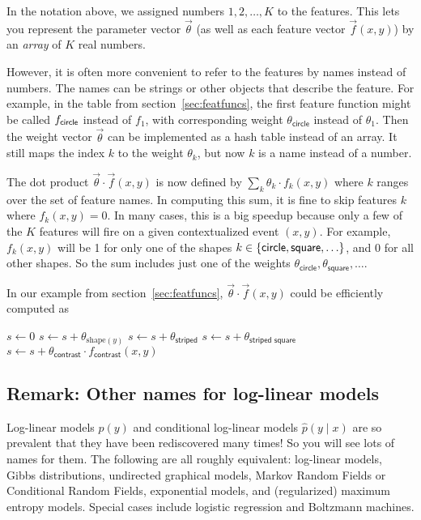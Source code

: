 \documentclass[11pt]{article}
\newcommand{\vtheta}{\vec{\theta}}
\newcommand{\ph}{\hat{p}}
\begin{document}
In the notation above, we assigned numbers $1,2,\ldots,K$ to the
features.  This lets you represent the parameter vector $\vtheta$
(as well as each feature vector $\vec{f}(x,y)$) by an {\em array} of
$K$ real numbers.

However, it is often more convenient to refer to the features by names
instead of numbers.  The names can be strings or other objects that
describe the feature.  For example, in the table from
section~\ref{sec:featfuncs}, the first feature function might be
called $f_{\sf circle}$ instead of $f_1$, with corresponding weight
$\theta_{\textsf{circle}}$ instead of $\theta_1$.  Then the weight vector
$\vtheta$ can be implemented as a hash table instead of an array.  It
still maps the index $k$ to the weight $\theta_k$, but now $k$ is a
name instead of a number.

The dot product $\vtheta \cdot \vec{f}(x,y)$ is now defined by
$\sum_k \theta_k \cdot f_k(x,y)$ where $k$ ranges over the set of
feature names.  
In computing this sum, it is fine to skip features $k$ where $f_k(x,y)
= 0$.  In many cases, this is a big speedup because only a few of the
$K$ features will fire on a given contextualized event $(x,y)$.  For
example, $f_k(x,y)$ will be 1 for only one of the shapes $k \in \{{\sf
  circle}, {\sf square}, \ldots\}$, and 0 for all other shapes.  So the 
sum includes just one of the weights $\theta_{\textsf{circle}},
\theta_{\textsf{square}}, \ldots$.

In our example from section~\ref{sec:featfuncs}, $\vtheta \cdot \vec{f}(x,y)$ could be efficiently
computed as
\begin{algorithmic}
\State $s \gets 0$
\State $s \gets s + \theta_{\textrm{shape}(y)}$
  \State $s \gets s + \theta_{\textsf{striped}}$
    \State $s \gets s + \theta_{\textsf{striped square}}$
  \EndIf
\EndIf
\State $s \gets s + \theta_{\textsf{contrast}} \cdot f_{\textsf{contrast}}(x,y)
$
\end{algorithmic}

\subsection{Remark: Other names for log-linear models}

Log-linear models $\ph(y)$ and conditional log-linear models
$\ph(y\mid x)$ are so prevalent that they have been rediscovered many
times!  So you will see lots of names for them.  The following are all
roughly equivalent: log-linear models, Gibbs distributions, undirected
graphical models, Markov Random Fields or Conditional Random Fields,
exponential models, and (regularized) maximum entropy models.  
Special cases include logistic regression and Boltzmann machines.
\end{document}
